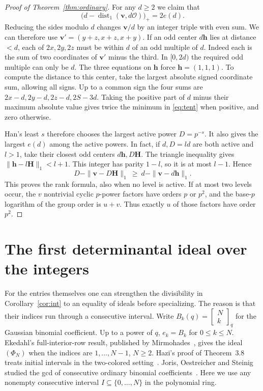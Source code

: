 \documentclass[11pt]{article}
\begin{document}
\begin{proof}[Proof of Theorem~\ref{thm:ordinary}]
For any \(d\ge2\) we claim that
\[
        \bigl(d-\operatorname{dist}_1(\mathbf v,d\mathcal O)\bigr)_+
                       =2e(d).
\]
Reducing the sides modulo \(d\) changes \(\mathbf v/d\) by an integer
triple with even sum. We can therefore use
\(\mathbf v'=(y+z,x+z,x+y)\). If an odd center \(d\mathbf h\) lies at
distance \(<d\), each of \(2x,2y,2z\) must be within \(d\) of an odd
multiple of \(d\). Indeed each is the sum of two coordinates of
\(\mathbf v'\) minus the third. In \([0,2d)\) the required odd multiple
can only be \(d\). The three equations on \(\mathbf h\) force
\(\mathbf h=(1,1,1)\). To compute the distance to this center, take
the largest absolute signed coordinate sum, allowing all signs.
Up to a common sign the four sums are
\(2x-d,2y-d,2z-d,2S-3d\). Taking the positive part of \(d\) minus their
maximum absolute value gives twice the minimum in \eqref{eq:tent}
when positive, and zero otherwise.

Han's least \(s\) therefore chooses the largest active power \(D=p^{-s}\).
It also gives the largest \(e(d)\) among the active powers. In fact, if
\(d,D=ld\) are both active and \(l>1\), take their closest odd centers
\(d\mathbf h,D\mathbf H\). The triangle inequality gives
\(\|\mathbf h-l\mathbf H\|_1<l+1\). This integer has parity \(1-l\),
so it is at most \(l-1\). Hence
\[
       D-\|\mathbf v-D\mathbf H\|_1
          \ \ge\ d-\|\mathbf v-d\mathbf h\|_1 .
\]
This proves the rank formula, also when no level is active. If at most
two levels occur, the \(v\) nontrivial cyclic \(p\)-power factors have
orders \(p\) or \(p^2\), and the base-\(p\) logarithm of the group order
is \(u+v\). Thus exactly \(u\) of those factors have order \(p^2\).
\end{proof}

\section{The first determinantal ideal over the integers}

For the entries themselves one can strengthen the divisibility in
Corollary~\ref{cor:int} to an equality of ideals before specializing.
The reason is that their indices run through a consecutive interval.
Write \(B_k(q)=\left[\begin{smallmatrix}N\\k\end{smallmatrix}\right]_q\)
for the Gaussian binomial coefficient. Up to a power of \(q\), \(e_k=B_k\)
for \(0\le k\le N\). Ekedahl's full-interior-row result, published by
Mirmohades~\cite[Theorem~3.1]{Mirmohades}, gives the ideal
\((\Phi_N)\) when the indices are \(1,\ldots,N-1\), \(N\ge2\).
Hazi's proof of Theorem~3.8 treats initial intervals in the two-colored
setting~\cite{Hazi}. Joris, Oestreicher and Steinig studied the gcd of
consecutive ordinary binomial coefficients~\cite{JOS}. Here we use any
nonempty consecutive interval \(I\subseteq\{0,\ldots,N\}\) in the
polynomial ring.
\end{document}
